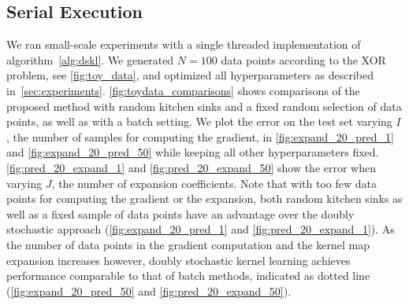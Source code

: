 \documentclass{article} %
\begin{document}
\subsection{Serial Execution}\label{sec:single_host}
We ran small-scale experiments with a single threaded implementation of algorithm~\autoref{alg:dskl}. We generated $N=100$ data points according to the XOR problem, see \autoref{fig:toy_data}, and optimized all hyperparameters as described in~\autoref{sec:experiments}.
%
\autoref{fig:toydata_comparisons} shows comparisons of the proposed method with random kitchen sinks and a fixed random selection of data points, as well as with a batch setting. We plot the error on the test set varying $I$, the number of samples for computing the gradient, in \autoref{fig:expand_20_pred_1} and \autoref{fig:expand_20_pred_50} while keeping all other hyperparameters fixed. \autoref{fig:pred_20_expand_1} and \autoref{fig:pred_20_expand_50} show the error when varying $J$, the number of expansion coefficients. Note that with too few data points for computing the gradient or the expansion, both random kitchen sinks as well as a fixed sample of data points have an advantage over the doubly stochastic approach (\autoref{fig:expand_20_pred_1} and \autoref{fig:pred_20_expand_1}). As the number of data points in the gradient computation and the kernel map expansion increases however, doubly stochastic kernel learning achieves performance comparable to that of batch methods, indicated as dotted line (\autoref{fig:expand_20_pred_50} and \autoref{fig:pred_20_expand_50}).
%
\end{document}
